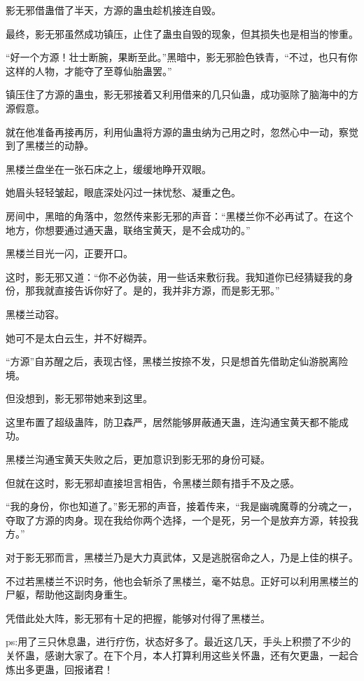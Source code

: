 \begin{this_body}
影无邪借蛊借了半天，方源的蛊虫趁机接连自毁。

最终，影无邪虽然成功镇压，止住了蛊虫自毁的现象，但其损失也是相当的惨重。

“好一个方源！壮士断腕，果断至此。”黑暗中，影无邪脸色铁青，“不过，也只有你这样的人物，才能夺了至尊仙胎蛊罢。”

镇压住了方源的蛊虫，影无邪接着又利用借来的几只仙蛊，成功驱除了脑海中的方源假意。

就在他准备再接再厉，利用仙蛊将方源的蛊虫纳为己用之时，忽然心中一动，察觉到了黑楼兰的动静。

黑楼兰盘坐在一张石床之上，缓缓地睁开双眼。

她眉头轻轻皱起，眼底深处闪过一抹忧愁、凝重之色。

房间中，黑暗的角落中，忽然传来影无邪的声音：“黑楼兰你不必再试了。在这个地方，你想要通过通天蛊，联络宝黄天，是不会成功的。”

黑楼兰目光一闪，正要开口。

这时，影无邪又道：“你不必伪装，用一些话来敷衍我。我知道你已经猜疑我的身份，那我就直接告诉你好了。是的，我并非方源，而是影无邪。”

黑楼兰动容。

她可不是太白云生，并不好糊弄。

“方源”自苏醒之后，表现古怪，黑楼兰按捺不发，只是想首先借助定仙游脱离险境。

但没想到，影无邪带她来到这里。

这里布置了超级蛊阵，防卫森严，居然能够屏蔽通天蛊，连沟通宝黄天都不能成功。

黑楼兰沟通宝黄天失败之后，更加意识到影无邪的身份可疑。

但就在这时，影无邪却直接坦言相告，令黑楼兰颇有措手不及之感。

“我的身份，你也知道了。”影无邪的声音，接着传来，“我是幽魂魔尊的分魂之一，夺取了方源的肉身。现在我给你两个选择，一个是死，另一个是放弃方源，转投我方。”

对于影无邪而言，黑楼兰乃是大力真武体，又是逃脱宿命之人，乃是上佳的棋子。

不过若黑楼兰不识时务，他也会斩杀了黑楼兰，毫不姑息。正好可以利用黑楼兰的尸躯，帮助他这副肉身重生。

凭借此处大阵，影无邪有十足的把握，能够对付得了黑楼兰。

ps:用了三只休息蛊，进行疗伤，状态好多了。最近这几天，手头上积攒了不少的关怀蛊，感谢大家了。在下个月，本人打算利用这些关怀蛊，还有欠更蛊，一起合炼出多更蛊，回报诸君！

\end{this_body}


